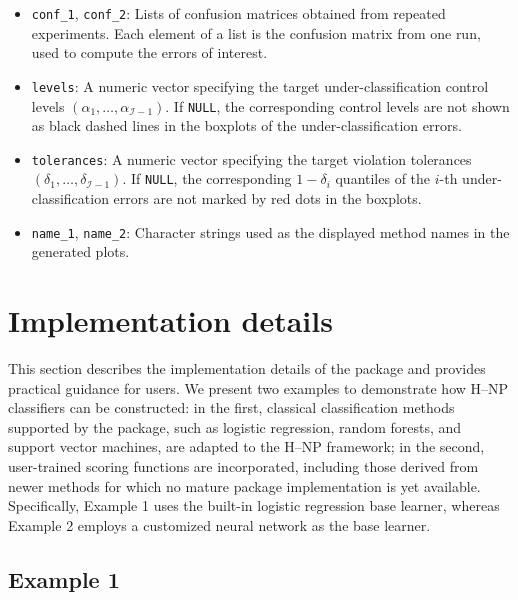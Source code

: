 \begin{itemize}


\item \texttt{conf\_1}, \texttt{conf\_2}: Lists of confusion matrices obtained from repeated experiments. Each element of a list is the confusion matrix from one run, used to compute the errors of interest.

\item \texttt{levels}: A numeric vector specifying the target under-classification control levels \((\alpha_1, \ldots, \alpha_{\mathcal{I}-1})\). If \texttt{NULL}, the corresponding control levels are not shown as black dashed lines in the boxplots of the under-classification errors.

\item \texttt{tolerances}: A numeric vector specifying the target violation tolerances \((\delta_1, \ldots, \delta_{\mathcal{I}-1})\). If \texttt{NULL}, the corresponding \(1-\delta_i\) quantiles of the \(i\)-th under-classification errors are not marked by red dots in the boxplots.


\item \texttt{name\_1}, \texttt{name\_2}: Character strings used as the displayed method names in the generated plots.


\end{itemize}







\section{Implementation details}\label{sec:implementation_details}

 This section describes the implementation details of the package and provides practical guidance for users. We present two examples to demonstrate how H--NP classifiers can be constructed: in the first, classical classification methods supported by the package, such as logistic regression, random forests, and support vector machines, are adapted to the H--NP framework; in the second, user-trained scoring functions are incorporated, including those derived from newer methods for which no mature package implementation is yet available. Specifically, Example 1 uses the built-in logistic regression base learner, whereas Example 2 employs a customized neural network as the base learner.


\subsection{Example 1}


